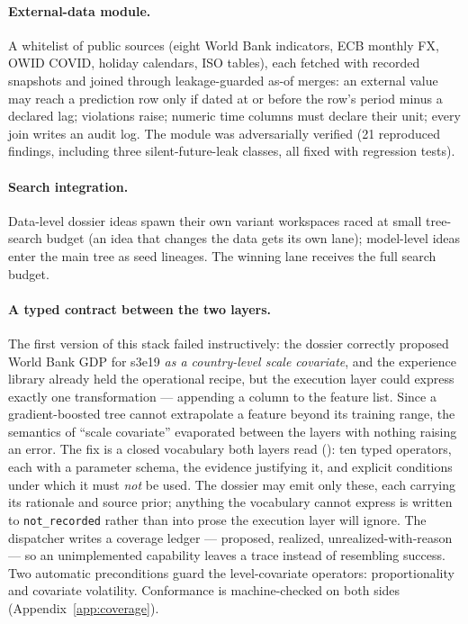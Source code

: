 \documentclass[11pt,a4paper]{article}
\begin{document}
\paragraph{External-data module.} A whitelist of public sources (eight World Bank indicators, ECB monthly FX, OWID COVID, holiday calendars, ISO tables), each fetched with recorded snapshots and joined through leakage-guarded as-of merges: an external value may reach a prediction row only if dated at or before the row's period minus a declared lag; violations raise; numeric time columns must declare their unit; every join writes an audit log. The module was adversarially verified (21 reproduced findings, including three silent-future-leak classes, all fixed with regression tests).

\paragraph{Search integration.} Data-level dossier ideas spawn their own variant workspaces raced at small tree-search budget (an idea that changes the data gets its own lane); model-level ideas enter the main tree as seed lineages. The winning lane receives the full search budget.

\paragraph{A typed contract between the two layers.} The first version of this stack failed
instructively: the dossier correctly proposed World Bank GDP for s3e19 \emph{as a country-level
scale covariate}, and the experience library already held the operational recipe, but the
execution layer could express exactly one transformation --- appending a column to the feature
list. Since a gradient-boosted tree cannot extrapolate a feature beyond its training range, the
semantics of ``scale covariate'' evaporated between the layers with nothing raising an error.
The fix is a closed vocabulary both layers read (): ten
typed operators, each with a parameter schema, the evidence justifying it, and explicit
conditions under which it must \emph{not} be used. The dossier may emit only these, each
carrying its rationale and source prior; anything the vocabulary cannot express is written to
\texttt{not\_recorded} rather than into prose the execution layer will ignore. The dispatcher
writes a coverage ledger --- proposed, realized, unrealized-with-reason --- so an unimplemented
capability leaves a trace instead of resembling success. Two automatic preconditions guard the
level-covariate operators: proportionality and covariate volatility. Conformance is
machine-checked on both sides (Appendix~\ref{app:coverage}).
\end{document}
